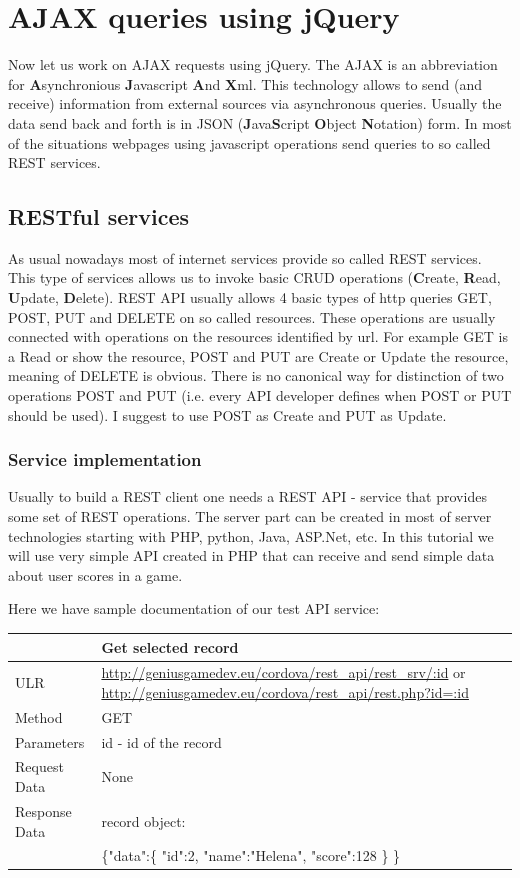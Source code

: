 \chapter{AJAX queries using jQuery }

Now let us work on AJAX requests using jQuery. The AJAX is an abbreviation for \textbf{A}synchronious \textbf{J}avascript \textbf{A}nd \textbf{X}ml. This technology allows to send (and receive) information from external sources via asynchronous queries. Usually the data send back and forth is in JSON (\textbf{J}ava\textbf{S}cript \textbf{O}bject \textbf{N}otation) form. In most of the situations webpages using javascript operations send queries to so called REST services.

\section{RESTful services}
As usual nowadays most of internet services provide so called REST services. This type of services allows us to invoke basic CRUD operations (\textbf{C}reate, \textbf{R}ead, \textbf{U}pdate, \textbf{D}elete). REST API usually allows 4 basic types of http queries GET, POST, PUT and DELETE on so called resources. These operations are usually connected with operations on the resources identified by url. For example GET is a Read or show the resource, POST and PUT are Create or Update the resource, meaning of DELETE is obvious. There is no canonical way for distinction of two operations POST and PUT (i.e. every API developer defines when POST or PUT should be used). I suggest to use POST as Create and PUT as Update.

\subsection{Service implementation}
Usually to build a REST client one needs a REST API - service that provides some set of REST operations. The server part can be created in most of server technologies starting with PHP, python, Java, ASP.Net, etc. In this tutorial we will use very simple API created in PHP that can receive and send simple data about user scores in a game.

Here we have sample documentation of our test API service:

\begin{tabularx}{\textwidth}{|l|X|}
\hline
&\textbf{Get selected record}\\\hline
ULR &   \url{http://geniusgamedev.eu/cordova/rest_api/rest_srv/:id} or \url{http://geniusgamedev.eu/cordova/rest_api/rest.php?id=:id}\\\hline
Method  & GET\\\hline
Parameters  & id - id of the record \\\hline
Request Data & None\\\hline
Response Data & record object:\\
&
\{"data":\{
    "id":2,
    "name":"Helena",
    "score":128
    \}
\}
\\\hline
\end{tabularx}

